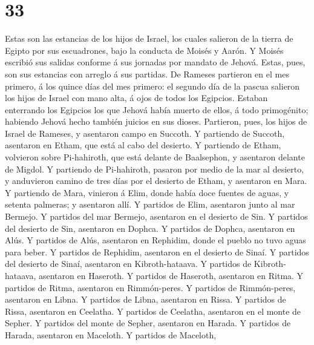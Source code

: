 \hypertarget{section-32}{%
\section{33}\label{section-32}}

 Estas son las estancias de los hijos de Israel, los cuales
salieron de la tierra de Egipto por sus escuadrones, bajo la conducta de
Moisés y Aarón.  Y Moisés escribió sus salidas conforme á
sus jornadas por mandato de Jehová. Estas, pues, son sus estancias con
arreglo á sus partidas.  De Rameses partieron en el mes
primero, á los quince días del mes primero: el segundo día de la pascua
salieron los hijos de Israel con mano alta, á ojos de todos los
Egipcios.  Estaban enterrando los Egipcios los que Jehová
había muerto de ellos, á todo primogénito; habiendo Jehová hecho también
juicios en sus dioses.  Partieron, pues, los hijos de Israel
de Rameses, y asentaron campo en Succoth.  Y partiendo de
Succoth, asentaron en Etham, que está al cabo del desierto. 
Y partiendo de Etham, volvieron sobre Pi-hahiroth, que está delante de
Baalsephon, y asentaron delante de Migdol.  Y partiendo de
Pi-hahiroth, pasaron por medio de la mar al desierto, y anduvieron
camino de tres días por el desierto de Etham, y asentaron en Mara.
 Y partiendo de Mara, vinieron á Elim, donde había doce
fuentes de aguas, y setenta palmeras; y asentaron allí.  Y
partidos de Elim, asentaron junto al mar Bermejo.  Y
partidos del mar Bermejo, asentaron en el desierto de Sin. 
Y partidos del desierto de Sin, asentaron en Dophca.  Y
partidos de Dophca, asentaron en Alús.  Y partidos de Alús,
asentaron en Rephidim, donde el pueblo no tuvo aguas para beber.
 Y partidos de Rephidim, asentaron en el desierto de Sinaí.
 Y partidos del desierto de Sinaí, asentaron en
Kibroth-hataava.  Y partidos de Kibroth-hataava, asentaron
en Haseroth.  Y partidos de Haseroth, asentaron en Ritma.
 Y partidos de Ritma, asentaron en Rimmón-peres.
 Y partidos de Rimmón-peres, asentaron en Libna.
 Y partidos de Libna, asentaron en Rissa.  Y
partidos de Rissa, asentaron en Ceelatha.  Y partidos de
Ceelatha, asentaron en el monte de Sepher.  Y partidos del
monte de Sepher, asentaron en Harada.  Y partidos de
Harada, asentaron en Maceloth.  Y partidos de Maceloth,
